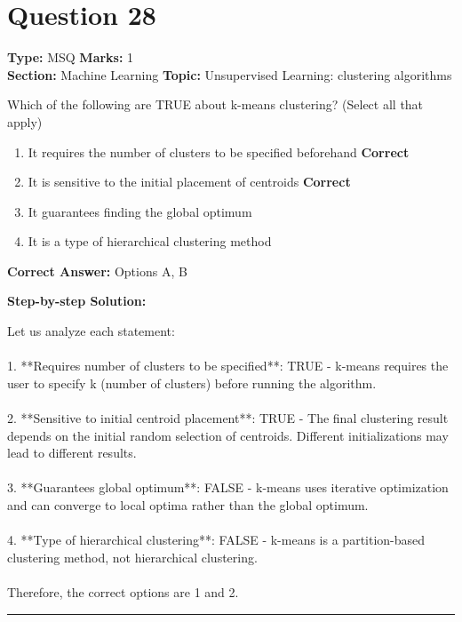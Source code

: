 \documentclass[11pt]{article}
\begin{document}
\section*{Question 28}
\textbf{Type:} MSQ \hfill \textbf{Marks:} 1\\
\textbf{Section:} Machine Learning \hfill \textbf{Topic:} Unsupervised Learning: clustering algorithms

Which of the following are TRUE about k-means clustering? (Select all that apply)


\begin{enumerate}[label=\textbf{\Alph*.}, leftmargin=1.8em]
\item It requires the number of clusters to be specified beforehand \hfill {\color{gategreen}\textbf{Correct}}\item It is sensitive to the initial placement of centroids \hfill {\color{gategreen}\textbf{Correct}}\item It guarantees finding the global optimum\item It is a type of hierarchical clustering method\end{enumerate}

\textbf{Correct Answer:} Options A, B

\textbf{Step-by-step Solution:}

Let us analyze each statement:\\
\\
1. **Requires number of clusters to be specified**: TRUE - k-means requires the user to specify k (number of clusters) before running the algorithm.\\
\\
2. **Sensitive to initial centroid placement**: TRUE - The final clustering result depends on the initial random selection of centroids. Different initializations may lead to different results.\\
\\
3. **Guarantees global optimum**: FALSE - k-means uses iterative optimization and can converge to local optima rather than the global optimum.\\
\\
4. **Type of hierarchical clustering**: FALSE - k-means is a partition-based clustering method, not hierarchical clustering.\\
\\
Therefore, the correct options are 1 and 2.

\vspace{0.8em}
\hrule
\vspace{0.4em}
\end{document}
